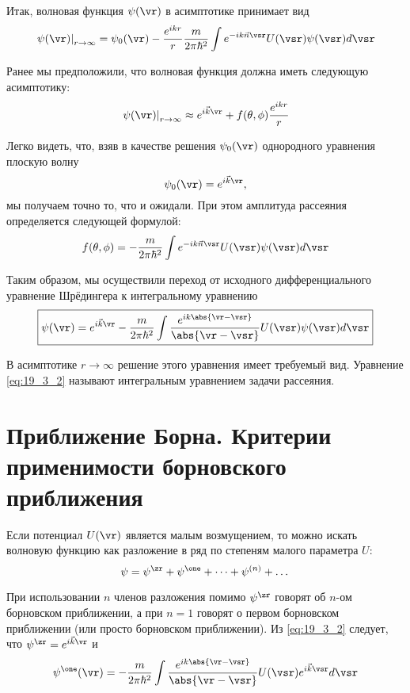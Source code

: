Итак, волновая функция $\psi(\vr)$ в асимптотике принимает вид
$$
\left. \psi(\vr) \right|_{r \to \infty} = \psi_0(\vr) - \frac{e^{ikr}}{r}\frac{m}{2\pi\hbar^2}\int e^{- ik\vec{n}\vsr} U(\vsr)\psi(\vsr)d\vsr
$$

Ранее мы предположили, что волновая функция должна иметь следующую асимптотику:
$$
\left. \psi(\vr) \right|_{r \to \infty} \approx e^{i\vec{k}\vr} + f(\theta, \phi)\frac{e^{ikr}}{r}
$$

Легко видеть, что, взяв в качестве решения $\psi_0(\vr)$ однородного уравнения плоскую волну
$$\psi_0(\vr) = e^{i\vec{k}\vr},$$
мы получаем точно то, что и ожидали. При этом амплитуда рассеяния определяется следующей формулой:
$$
f(\theta, \phi) =  - \frac{m}{2\pi\hbar^2}\int e^{- ik\vec{n}\vsr} U(\vsr)\psi(\vsr)d\vsr
$$

Таким образом, мы осуществили переход от исходного дифференциального уравнение Шрёдингера к интегральному уравнению
\begin{equation}
\label{eq:19_3_2}
\boxed{\psi(\vr) = e^{i\vec{k}\vr} - \frac{m}{2\pi\hbar^2}\int \frac{e^{ik\abs{\vr - \vsr}}}{\abs{\vr - \vsr}} U(\vsr)\psi(\vsr)d\vsr}
\end{equation}

В асимптотике $r \to \infty$ решение этого уравнения имеет требуемый вид. Уравнение \eqref{eq:19_3_2} называют интегральным уравнением задачи рассеяния.

\section{Приближение Борна. Критерии применимости борновского приближения}

Если потенциал $U(\vr)$ является малым возмущением, то можно искать волновую функцию как разложение в ряд по степеням малого параметра $U$:
\begin{equation}
\label{eq:19_4_1}
\psi = \psi^\zr + \psi^\one + \dots + \psi^{(n)} + \dots
\end{equation}

При использовании $n$ членов разложения помимо $\psi^\zr$ говорят об $n$-ом борновском приближении, а при $n = 1$ говорят о первом борновском приближении (или просто борновском приближении). Из \eqref{eq:19_3_2} следует, что $\psi^\zr = e^{i \vec{k} \vr}$ и
\begin{equation}
\label{eq:19_4_2}
\psi^\one(\vr) = -\frac{m}{2\pi \hbar^2} \int \frac{e^{ik \abs{\vr - \vsr}}}{\abs{\vr - \vsr}} U(\vsr) e^{i \vec{k} \vsr} d\vsr
\end{equation}

